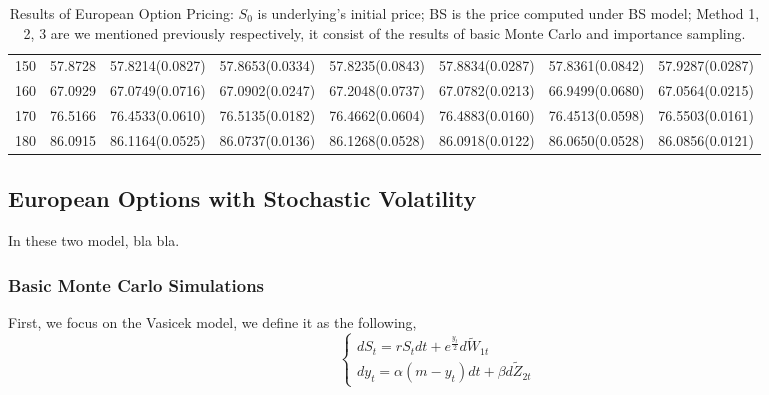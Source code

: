 \documentclass[12pt]{article}  %
\numberwithin{equation}{subsection}
\theoremstyle{plain}
\begin{document}
\begin{table}
\begin{center}
\begin{tabular}{cccccccc}
150 & 57.8728 & 57.8214(0.0827) & 57.8653(0.0334) & 57.8235(0.0843) & 57.8834(0.0287) & 57.8361(0.0842) & 57.9287(0.0287) \\
160 & 67.0929 & 67.0749(0.0716) & 67.0902(0.0247) & 67.2048(0.0737) & 67.0782(0.0213) & 66.9499(0.0680) & 67.0564(0.0215) \\
170 & 76.5166 & 76.4533(0.0610) & 76.5135(0.0182) & 76.4662(0.0604) & 76.4883(0.0160) & 76.4513(0.0598) & 76.5503(0.0161) \\
180 & 86.0915 & 86.1164(0.0525) & 86.0737(0.0136) & 86.1268(0.0528) & 86.0918(0.0122) & 86.0650(0.0528) & 86.0856(0.0121) \\ \bottomrule
\end{tabular}
\caption[Results of European Option Pricing]{Results of European Option Pricing: $S_0$ is underlying's initial price; BS is the price computed under BS model; Method 1, 2, 3 are we mentioned previously respectively, it consist of the results of basic Monte Carlo and importance sampling.}
\end{center}
\end{table}
\newpage

\subsection{European Options with Stochastic Volatility}

In these two model, bla bla.

\subsubsection{Basic Monte Carlo Simulations}

First, we focus on the Vasicek model, we define it as the following,
\[
\left\{
\begin{array}{ll}
dS_t= rS_tdt+e^{\frac{y_t}{2}}d\tilde{W}_{1t}\\
dy_t=\alpha\left( m-y_t\right) dt+\beta d\tilde{Z}_{2t}
\end{array} \right.
\]
\end{document}
